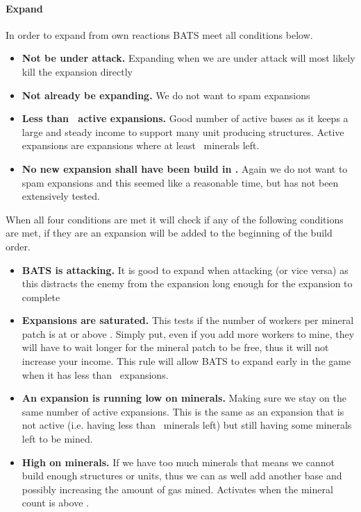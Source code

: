 \paragraph{Expand}
In order to expand from own reactions BATS meet all conditions below.
\begin{itemize}
  \item \textbf{Not be under attack.} Expanding when we are under attack will most likely kill the expansion
	  directly
	\item \textbf{Not already be expanding.} We do not want to spam expansions
	\item \textbf{Less than \CommanderExpansionActiveMax~active expansions.} Good number of
	  active bases as it keeps a large and steady income to support many unit producing structures.
	  Active expansions are expansions where at least
	  \classificationExpansionExpansionMineralsLow~minerals left.
	\item \textbf{No new expansion shall have been build in \CommanderExpansionIntervalMin.} Again we do not
	  want to spam expansions and this seemed like a reasonable time, but has not been extensively
	  tested.
\end{itemize}
When all four conditions are met it will check if any of the following conditions are met, if they
are an expansion will be added to the beginning of the build order.
\begin{itemize}
	\item \textbf{BATS is attacking.} It is good to expand when attacking (or vice versa) as this
	  distracts the enemy from the expansion long enough for the expansion to complete\cite{day9}
	\item \textbf{Expansions are saturated.} This tests if the number of workers per mineral patch is at or
	  above \classificationExpansionWorkersPerMineralSaturation. Simply put, even if you add more
	  workers to mine, they will have to wait longer for the mineral patch to be free, thus it will
	  not increase your income. This rule will allow BATS to expand early in the game when it has
	  less than \CommanderExpansionActiveMax~expansions.
	\item \textbf{An expansion is running low on minerals.} Making sure we stay on the same number of active
	  expansions. This is the same as an expansion that is not active (i.e. having less than
	  \classificationExpansionExpansionMineralsLow~minerals left) but still having some minerals
	  left to be mined.
	\item \textbf{High on minerals.} If we have too much minerals that means we cannot build enough structures
	  or units, thus we can as well add another base and possibly increasing the amount of gas
	  mined. Activates when the mineral count is above \classificationHighOnMinerals.
\end{itemize}


